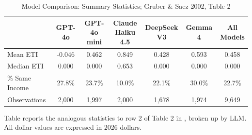 \begin{table}[!htbp] \centering
  \caption{Model Comparison: Summary Statistics; Gruber \& Saez 2002, Table 2}
  \label{tab:obs_summ_stats}
  \begin{tabular}{lcccccc}
  \toprule
  & GPT-4o & \shortstack{GPT-4o \\ mini} & \shortstack{Claude \\ Haiku 4.5} & \shortstack{DeepSeek \\ V3} & Gemma 4 & \shortstack{All \\ Models} \\
  \midrule
  Mean ETI & -0.046 & 0.462 & 0.849 & 0.428 & 0.593 & 0.458 \\
  Median ETI & 0.000 & 0.000 & 0.653 & 0.000 & 0.000 & 0.000 \\
  \% Same Income & 27.8\% & 23.7\% & 10.0\% & 22.1\% & 30.0\% & 22.7\% \\
  \midrule
  Observations & 2,000 & 1,997 & 2,000 & 1,678 & 1,974 & 9,649 \\
  \bottomrule
  \end{tabular}
  \begin{flushleft}\footnotesize
  Table reports the analogous statistics to row 2 of Table 2 in \cite{GruberSaez2002}, broken up by LLM. All dollar values are expressed in 2026 dollars.\\
  \end{flushleft}
\end{table}